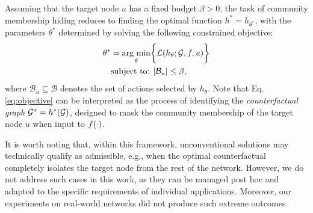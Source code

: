 
Assuming that the target node $u$ has a fixed budget $\beta > 0$, the task of community membership hiding reduces to finding the optimal function $h^* = h_{\theta^*}$, with the parameters $ \theta^*$ determined by solving the following constrained objective:
\begin{equation}
\label{eq:objective}
\begin{split}
    \theta^* & = \underset{\theta}{\text{arg min}} \bigg \lbrace \mathcal{L}(h_{\theta};\mathcal{G}, f, u) \bigg \rbrace \\
    & \text{subject to: } |\mathcal{B}_{u}| \leq \beta,
\end{split}
\end{equation}
where $\mathcal{B}_{u} \subseteq \mathcal{B}$ denotes the set of actions selected by $h_{\theta}$.
Note that Eq. \ref{eq:objective} can be interpreted as the process of identifying the \emph{counterfactual graph} $\mathcal{G}^* = h^*(\mathcal{G})$, designed to mask the community membership of the target node $u$ when input to $f(\cdot)$.

It is worth noting that, within this framework, unconventional solutions may technically qualify as admissible, e.g., when the optimal counterfactual completely isolates the target node from the rest of the network. 
However, we do not address such cases in this work, as they can be managed post hoc and adapted to the specific requirements of individual applications. Moreover, our experiments on real-world networks did not produce such extreme outcomes.